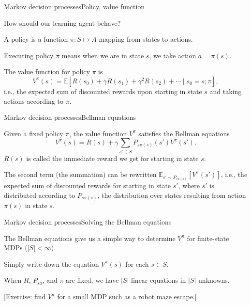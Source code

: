 \documentclass{beamer}
\def\Expec{\mathbb{E}}
\begin{document}
\begin{frame}{Markov decision processes}{Policy, value function}

  How should our learning agent behave?

  \medskip

  A \alert{policy} is a function $\pi : S \mapsto A$ mapping from states
  to actions.

  \medskip

  \alert{Executing} policy $\pi$ means when we are in state $s$, we
  take action $a = \pi(s)$.

  \medskip

  The \alert{value function} for policy $\pi$ is
  \[ V^\pi(s)=\Expec[ R(s_0)+\gamma R(s_1)+\gamma^2R(s_2)+\cdots \mid s_0 = s ; \pi], \]
  i.e., the expected sum of discounted rewards upon starting in state
  $s$ and taking actions according to $\pi$.
  
\end{frame}


\begin{frame}{Markov decision processes}{Bellman equations}

  Given a fixed policy $\pi$, the value function $V^\pi$ satisfies the
  \alert{Bellman equations}
  \[ V^\pi(s) = R(s) + \gamma\sum_{s'\in S} P_{s\pi(s)}(s')V^\pi(s') . \]
  $R(s)$ is called the \alert{immediate reward} we get for starting in
  state $s$.

  \medskip

  The second term (the summation) can be rewritten $\Expec_{s' \sim
    P_{s\pi(s)}}[V^\pi(s')]$, i.e., the expected sum of discounted
  rewards for starting in state $s'$, where $s'$ is distributed
  according to $P_{s\pi(s)}$, the distribution over states resulting
  from action $\pi(s)$ in state $s$.

\end{frame}


\begin{frame}{Markov decision processes}{Solving the Bellman equations}

  The Bellman equations give us a simple way to determine $V^\pi$ for
  finite-state MDPs ($|S| < \infty$).

  \medskip

  Simply write down the equation $V^\pi(s)$ for each $s\in S$.

  \medskip

  When $R$, $P_{sa}$, and $\pi$ are fixed, we have $|S|$ linear
  equations in $|S|$ unknowns.

  \medskip

  [Exercise: find $V^\pi$ for a small MDP such as a robot maze escape.]
  
\end{frame}
\end{document}

